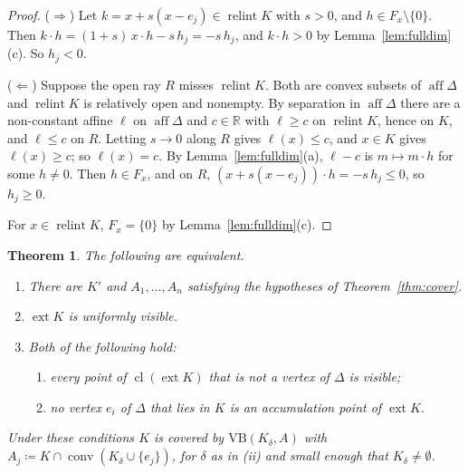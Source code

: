 \documentclass[11pt]{article}
\newcommand{\R}{\mathbb{R}}
\newcommand{\VB}{\mathrm{VB}}
\DeclareMathOperator{\conv}{conv}
\DeclareMathOperator{\relint}{relint}
\DeclareMathOperator{\aff}{aff}
\DeclareMathOperator{\ext}{ext}
\DeclareMathOperator{\cl}{cl}
\theoremstyle{plain}
\newtheorem{theorem}{Theorem}[section]
\theoremstyle{definition}
\theoremstyle{remark}
\begin{document}
\begin{proof}
($\Rightarrow$) Let $k=x+s(x-e_j)\in\relint K$ with $s>0$, and $h\in F_x\setminus\{0\}$.
Then $k\cdot h=(1+s)\,x\cdot h-s\,h_j=-s\,h_j$, and $k\cdot h>0$ by
Lemma~\ref{lem:fulldim}(c). So $h_j<0$.

($\Leftarrow$) Suppose the open ray $R$ misses $\relint K$. Both are convex subsets of
$\aff\Delta$ and $\relint K$ is relatively open and nonempty. By separation in $\aff\Delta$
\cite[Thm.~11.3]{Rockafellar} there are a non-constant affine $\ell$ on $\aff\Delta$ and %
$c\in\R$ with $\ell\ge c$ on $\relint K$, hence on $K$, and $\ell\le c$ on $R$. Letting
$s\to0$ along $R$ gives $\ell(x)\le c$, and $x\in K$ gives $\ell(x)\ge c$; so $\ell(x)=c$.
By Lemma~\ref{lem:fulldim}(a), $\ell-c$ is $m\mapsto m\cdot h$ for some $h\neq0$. Then
$h\in F_x$, and on $R$, $(x+s(x-e_j))\cdot h=-s\,h_j\le0$, so $h_j\ge0$.

For $x\in\relint K$, $F_x=\{0\}$ by Lemma~\ref{lem:fulldim}(c).
\end{proof}

\begin{theorem}\label{thm:vis}
The following are equivalent.
\begin{enumerate}[label=(\roman*)]
  \item There are $K'$ and $A_1,\dots,A_n$ satisfying the hypotheses of
  Theorem~\ref{thm:cover}.
  \item $\ext K$ is uniformly visible.
  \item Both of the following hold:
  \begin{enumerate}[label=(\alph*)]
    \item every point of $\cl(\ext K)$ that is not a vertex of $\Delta$ is visible;
    \item no vertex $e_i$ of $\Delta$ that lies in $K$ is an accumulation point of
    $\ext K$.
  \end{enumerate}
\end{enumerate}
Under these conditions $K$ is covered by $\VB(K_\delta,A)$ with
$A_j\coloneqq K\cap\conv(K_\delta\cup\{e_j\})$, for $\delta$ as in (ii) and small enough
that $K_\delta\neq\emptyset$.
\end{theorem}
\end{document}
